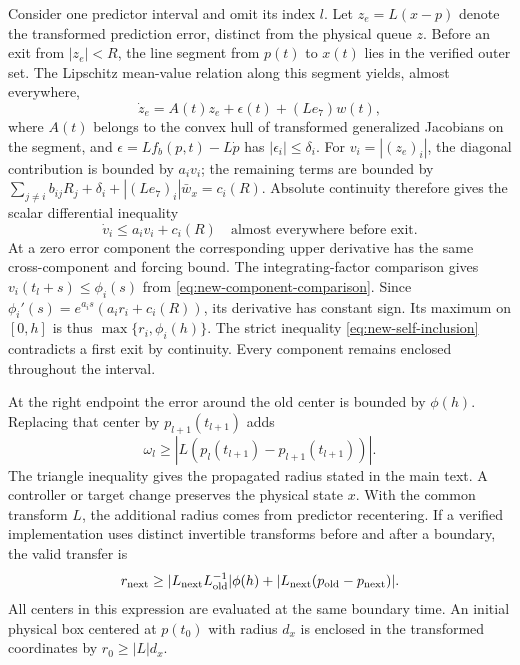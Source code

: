 \documentclass[journal,10pt]{IEEEtran}
\begin{document}
Consider one predictor interval and omit its index $l$. Let
$z_e=L(x-p)$ denote the transformed prediction error, distinct from the
physical queue $z$. Before an exit from $|z_e|<R$, the line segment from
$p(t)$ to $x(t)$ lies in the verified outer set. The Lipschitz mean-value
relation along this segment yields, almost everywhere,
\begin{equation}
 \dot z_e=A(t)z_e+\epsilon(t)+(Le_7)w(t),
 \label{eq:new-error-dynamics}
\end{equation}
where $A(t)$ belongs to the convex hull of transformed generalized Jacobians
on the segment, and
$\epsilon=L f_b(p,t)-L\dot p$ has $|\epsilon_i|\le\delta_i$.
For $v_i=|(z_e)_i|$, the diagonal contribution is bounded by $a_iv_i$;
the remaining terms are bounded by
$\sum_{j\ne i}b_{ij}R_j+\delta_i+|(Le_7)_i|\bar w_x=c_i(R)$.
Absolute continuity therefore gives the scalar differential inequality
\begin{equation}
 \dot v_i\le a_iv_i+c_i(R)
 \quad\text{almost everywhere before exit}.
 \label{eq:new-error-comparison-proof}
\end{equation}
At a zero error component the corresponding upper derivative has the same
cross-component and forcing bound. The integrating-factor comparison gives
$v_i(t_l+s)\le\phi_i(s)$ from
\eqref{eq:new-component-comparison}. Since
$\phi_i'(s)=e^{a_is}(a_ir_i+c_i(R))$, its derivative has constant sign.
Its maximum on $[0,h]$ is thus $\max\{r_i,\phi_i(h)\}$.
The strict inequality \eqref{eq:new-self-inclusion} contradicts a first
exit by continuity. Every component remains enclosed throughout the interval.

At the right endpoint the error around the old center is bounded by
$\phi(h)$. Replacing that center by $p_{l+1}(t_{l+1})$ adds
\begin{equation}
 \omega_l\ge
 |L(p_l(t_{l+1})-p_{l+1}(t_{l+1}))|.
 \label{eq:new-recentering-bound}
\end{equation}
The triangle inequality gives the propagated radius stated in the main
text. A controller or target change preserves the physical state $x$.
With the common transform $L$, the additional radius comes from predictor
recentering. If a verified implementation
uses distinct invertible transforms before and after a boundary, the valid
transfer is
\begin{equation}
 r_{\rm next}\ge
 |L_{\rm next}L_{\rm old}^{-1}|\phi(h)
 +|L_{\rm next}(p_{\rm old}-p_{\rm next})|.
 \label{eq:new-coordinate-transfer}
\end{equation}
All centers in this expression are evaluated at the same boundary time.
An initial physical box centered at $p(t_0)$ with radius $d_x$ is enclosed
in the transformed coordinates by $r_0\ge|L|d_x$.
\end{document}
